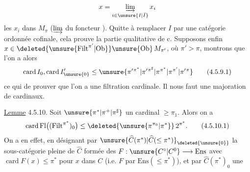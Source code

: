 \[
x=\varinjlim_{i\in\unsure{I|\bar I}}x_i
\]
les $x_i$ dans $M_\pi$ ($\varinjlim$  du foncteur
).  Quitte à remplacer $I$ par une catégorie ordonnée  cofinale, cela prouve la partie qualitative de c. Supposons enfin $x\in\deleted{\unsure{\mathrm{Filt}^{\pi'}|\mathrm{Ob}}}\unsure{\mathrm{Ob}}\,M_{\pi'}$, où $\pi'>\pi$,  montrons que l'on a alors
\[
\operatorname{card}I_0,\operatorname{card}I'_{\unsure{0}}\leq\unsure{\pi'{}^{\pi^*}|\pi'{}^{\pi^\sharp}|\pi^{\pi^*}|\pi^{\pi'}|\pi'{}^\pi}
\tag*{(4.5.9.1)}
\]
ce qui  de prouver que l'on a une filtration cardinale. Il nous faut une majoration de cardinaux. 

\uline{Lemme} 4.5.10. Soit $\unsure{\pi^*|\pi^+|\pi^\sharp}$ un cardinal $\geq\pi_1$. Alors on a
\[
\operatorname{card}\mathrm{Fl}\bigl((\mathrm{Filt}^{\pi^*})_0\bigr)
\leq\deleted{\unsure{\pi^{\pi_0}|\pi^*}}\,2^{\pi^*}.
\tag*{(4.5.10.1)}
\]
On a en effet, en désignant par $\unsure{\widehat C(\pi^*)|\widehat C(\leq\pi^*)}_{\deleted{\unsure{0}}}$ la sous-catégorie  pleine de $\widehat C$ formée des $F:\unsure{C^\circ|C^0}\longrightarrow\mathrm{Ens}$ avec $\operatorname{card}F(x)\leq\pi^*$ pour  $x$ dans $C$ (i.e. $F$  par $\mathrm{Ens}(\leq\pi^*)$), et par $\widehat C(\pi^*)_0$ une

